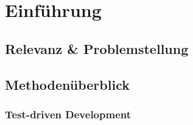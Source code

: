 
\section{Einführung}
\label{Einführung}
\subsection{Relevanz \& Problemstellung}



\subsection{Methodenüberblick}
\subsubsection{Test-driven Development}

